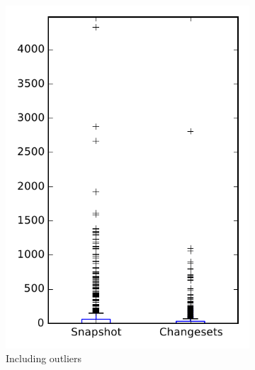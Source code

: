 \begin{figure}
\centering
    \begin{subfigure}{.4\textwidth}
        \centering
        \includegraphics[height=0.4\textheight]{figures/flt/rq1_overview}
        \caption{Including outliers}\label{fig:flt:rq1:overview_outlier}
    \end{subfigure}%
    \begin{subfigure}{.4\textwidth}
        \centering

\end{subfigure}
\end{figure}
